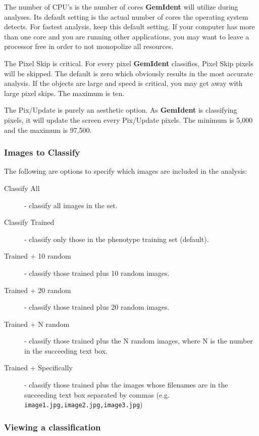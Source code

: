 \documentclass[12pt]{article}
\begin{document}
The {\sf number of CPU's} is the number of cores {\bf GemIdent} will utilize during analyses. Its default setting is the actual number of cores the operating system detects. For fastest analysis, keep this default setting. If your computer has more than one core and you are running other applications, you may want to leave a processor free in order to not monopolize all resources.

The {\sf Pixel Skip} is critical. For every pixel {\bf GemIdent} classifies, {\sf Pixel Skip} pixels will be skipped. The default is zero which obviously results in the most accurate analysis. If the objects are large and speed is critical, you may get away with large pixel skips. The maximum is ten.

The {\sf Pix/Update} is purely an aesthetic option. As {\bf GemIdent} is classifying pixels, it will update the screen every {\sf Pix/Update} pixels. The minimum is 5,000 and the maximum is 97,500.

\subsubsection{Images to Classify}

The following are options to specify which images are included in the analysis:

\begin{description}
\item[Classify All] - classify all images in the set.
\item[Classify Trained] - classify only those in the phenotype training set (default).
\item[Trained + 10 random] - classify those trained plus 10 random images.
\item[Trained + 20 random] - classify those trained plus 20 random images.
\item[Trained + N random] - classify those trained plus the N random images, where N is the number in the succeeding text box.
\item[Trained + Specifically] - classify those trained plus the images whose filenames are in the succeeding text box separated by commas (e.g. {\tt image1.jpg,image2.jpg,image3.jpg})
\end{description}

\subsubsection{Viewing a classification}
\end{document}
